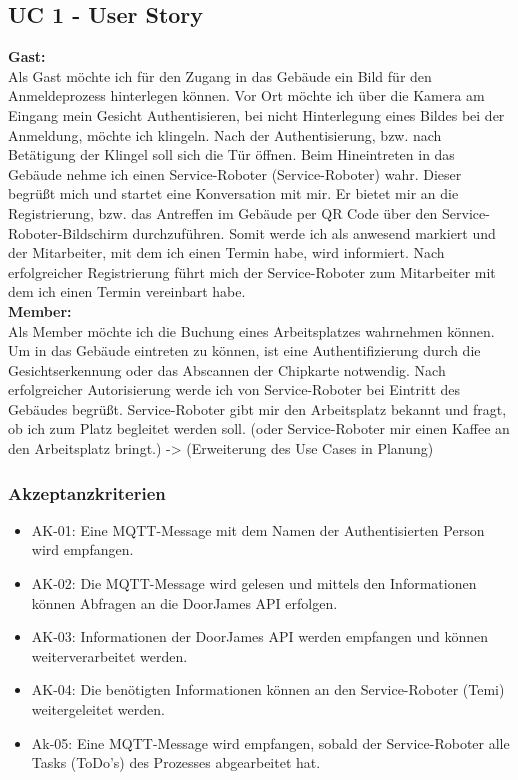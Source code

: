 \documentclass[
  ngerman           %
  ,twoside          %
  ,11pt
  ,pdftex
]{report}
\begin{document}
\subsection*{UC 1 - User Story}
\textbf{Gast:}
\\
Als Gast möchte ich für den Zugang in das Gebäude ein Bild für den Anmeldeprozess hinterlegen können. Vor Ort möchte ich über die Kamera 
am Eingang mein Gesicht Authentisieren, bei nicht Hinterlegung eines Bildes bei der Anmeldung, möchte ich klingeln. Nach der 
Authentisierung, bzw. nach Betätigung der Klingel soll sich die Tür öffnen. Beim Hineintreten in das Gebäude nehme ich einen Service-Roboter 
(Service-Roboter) wahr. Dieser begrüßt mich und startet eine Konversation mit mir. Er bietet mir an die Registrierung, bzw. das Antreffen im Gebäude 
per QR Code über den Service-Roboter-Bildschirm durchzuführen. Somit werde ich als anwesend markiert und der Mitarbeiter, mit dem ich einen Termin 
habe, wird informiert. Nach erfolgreicher Registrierung führt mich der Service-Roboter zum Mitarbeiter mit dem ich einen Termin vereinbart habe.
\\
\linebreak
\textbf{Member:}\\

Als Member möchte ich die Buchung eines Arbeitsplatzes wahrnehmen können. Um in das Gebäude eintreten zu können, ist eine Authentifizierung durch 
die Gesichtserkennung oder das Abscannen der Chipkarte notwendig. Nach erfolgreicher Autorisierung werde ich von Service-Roboter bei Eintritt des Gebäudes 
begrüßt. Service-Roboter gibt mir den Arbeitsplatz bekannt und fragt, ob ich zum Platz begleitet werden soll. 
(oder Service-Roboter mir einen Kaffee an den Arbeitsplatz bringt.) -> (Erweiterung des Use Cases in Planung)

\subsubsection*{Akzeptanzkriterien}
\begin{itemize}
    \item AK-01: Eine MQTT-Message mit dem Namen der Authentisierten Person wird empfangen.
    \item AK-02: Die MQTT-Message wird gelesen und mittels den Informationen können Abfragen an die DoorJames API erfolgen.
    \item AK-03: Informationen der DoorJames API werden empfangen und können weiterverarbeitet werden. 
    \item AK-04: Die benötigten Informationen können an den Service-Roboter (Temi) weitergeleitet werden.
    \item Ak-05: Eine MQTT-Message wird empfangen, sobald der Service-Roboter alle Tasks (ToDo's)  des Prozesses abgearbeitet hat. 
\end{itemize}
\end{document}
